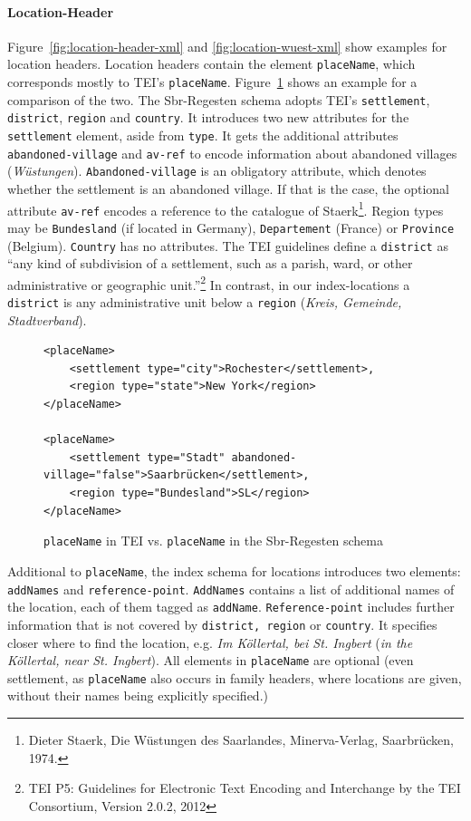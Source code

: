 \paragraph{Location-Header}
\label{sec:location-header}
Figure~\ref{fig:location-header-xml} and \ref{fig:location-wuest-xml} show examples for location headers. Location headers contain the element \texttt{placeName}, which corresponds mostly to TEI's \texttt{placeName}. Figure~\ref{fig:placeName} shows an example for a comparison of the two. The Sbr-Regesten schema adopts TEI's \texttt{settlement}, \texttt{district}, \texttt{region} and \texttt{country}. It introduces two new attributes for the \texttt{settlement} element, aside from \texttt{type}. It gets the additional attributes \texttt{abandoned-village} and \texttt{av-ref} to encode information about abandoned villages (\textit{Wüstungen}). \texttt{Abandoned-village} is an obligatory attribute, which denotes whether the settlement is an abandoned village. If that is the case, the optional attribute \texttt{av-ref} encodes a reference to the catalogue of Staerk\footnote{Dieter Staerk, Die Wüstungen des Saarlandes, Minerva-Verlag, Saarbrücken, 1974.}. Region types may be \texttt{Bundesland} (if located in Germany), \texttt{Departement} (France) or \texttt{Province} (Belgium). \texttt{Country} has no attributes. The TEI guidelines define a \texttt{district} as “any kind of subdivision of a settlement, such as a parish, ward, or other administrative or geographic unit.”\footnote{TEI P5: Guidelines for Electronic Text Encoding and Interchange by the TEI Consortium, Version 2.0.2, 2012} In contrast, in our index-locations a \texttt{district} is any administrative unit below a \texttt{region} (\textit{Kreis, Gemeinde, Stadtverband}).

\begin{figure}[H]
\centering
\begin{verbatim}
<placeName>
    <settlement type="city">Rochester</settlement>,
    <region type="state">New York</region>
</placeName>

<placeName>
    <settlement type="Stadt" abandoned-village="false">Saarbrücken</settlement>,
    <region type="Bundesland">SL</region>
</placeName>
\end{verbatim}
\caption{\texttt{placeName} in TEI vs. \texttt{placeName} in the Sbr-Regesten schema}
\label{fig:placeName}
\end{figure}

Additional to \texttt{placeName}, the index schema for locations introduces two elements: \texttt{addNames} and \texttt{reference-point}. \texttt{AddNames} contains a list of additional names of the location, each of them tagged as \texttt{addName}. \texttt{Reference-point} includes further information that is not covered by \texttt{district, region} or \texttt{country}. It specifies closer where to find the location, e.g. \textit{Im Köllertal, bei St. Ingbert} (\textit{in the Köllertal, near St. Ingbert}). All elements in \texttt{placeName} are optional (even settlement, as \texttt{placeName} also occurs in family headers, where locations are given, without their names being explicitly specified.)   


